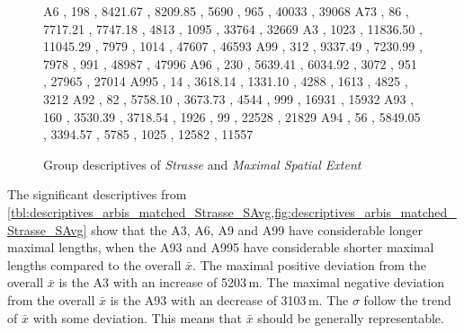 \begin{figure}[ht!]
\begin{minipage}{0.55\textwidth}
{			A6   , 198  , 8421.67  , 8209.85  , 5690 , 965  , 40033 , 39068 
			A73  , 86   , 7717.21  , 7747.18  , 4813 , 1095 , 33764 , 32669 
			A3   , 1023 , 11836.50 , 11045.29 , 7979 , 1014 , 47607 , 46593 
			A99  , 312  , 9337.49  , 7230.99  , 7978 , 991  , 48987 , 47996 
			A96  , 230  , 5639.41  , 6034.92  , 3072 , 951  , 27965 , 27014 
			A995 , 14   , 3618.14  , 1331.10  , 4288 , 1613 , 4825  , 3212  
			A92  , 82   , 5758.10  , 3673.73  , 4544 , 999  , 16931 , 15932 
			A93  , 160  , 3530.39  , 3718.54  , 1926 , 99   , 22528 , 21829 
			A94  , 56   , 5849.05  , 3394.57  , 5785 , 1025 , 12582 , 11557 
		}\data
		\pgfplotstablesort[sort key=mean, sort cmp=float >]{\datasorted}{\data}
		\tiny
		\centering
		\label{fig:descriptives_arbis_matched_Strasse_SMax}
	\end{minipage}%
	\caption{Group descriptives of \textit{Strasse} and \textit{Maximal Spatial Extent}}
\end{figure}
The significant descriptives from \cref{tbl:descriptives_arbis_matched_Strasse_SAvg,fig:descriptives_arbis_matched_Strasse_SAvg} show that the A3, A6, A9 and A99 have considerable longer maximal lengths, when the A93 and A995 have considerable shorter maximal lengths compared to the overall $\bar{x}$. The maximal positive deviation from the overall $\bar{x}$ is the A3 with an increase of 5203\,m. The maximal negative deviation from the overall $\bar{x}$ is the A93 with an decrease of 3103\,m. The $\sigma$ follow the trend of $\bar{x}$ with some deviation. This means that $\bar{x}$ should be generally representable. 
